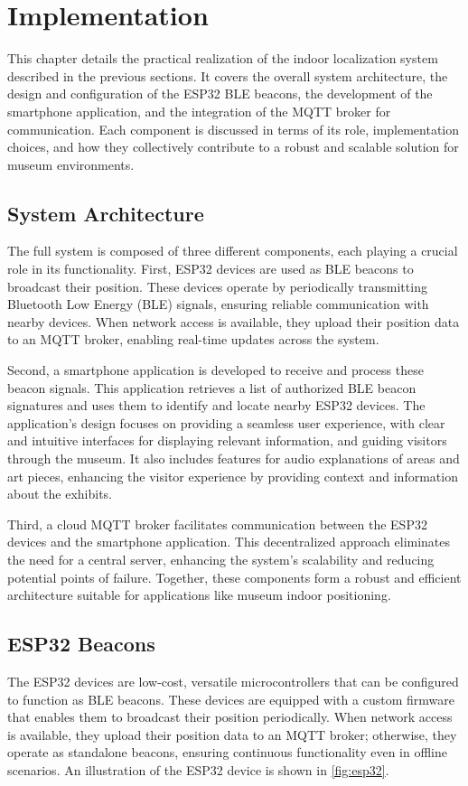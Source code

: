 \chapter{Implementation}
\label{chap:implementation}

This chapter details the practical realization of the indoor localization system described in the previous sections. It covers the overall system architecture, the design and configuration of the ESP32 BLE beacons, the development of the smartphone application, and the integration of the MQTT broker for communication. Each component is discussed in terms of its role, implementation choices, and how they collectively contribute to a robust and scalable solution for museum environments.

\section{System Architecture}
The full system is composed of three different components, each playing a crucial role in its functionality. First, ESP32 devices are used as BLE beacons to broadcast their position. These devices operate by periodically transmitting Bluetooth Low Energy (BLE) signals, ensuring reliable communication with nearby devices. When network access is available, they upload their position data to an MQTT broker, enabling real-time updates across the system.

Second, a smartphone application is developed to receive and process these beacon signals. This application retrieves a list of authorized BLE beacon signatures and uses them to identify and locate nearby ESP32 devices. The application’s design focuses on providing a seamless user experience, with clear and intuitive interfaces for displaying relevant information, and guiding visitors through the museum. It also includes features for audio explanations of areas and art pieces, enhancing the visitor experience by providing context and information about the exhibits.

Third, a cloud MQTT broker facilitates communication between the ESP32 devices and the smartphone application. This decentralized approach eliminates the need for a central server, enhancing the system’s scalability and reducing potential points of failure. Together, these components form a robust and efficient architecture suitable for applications like museum indoor positioning.

\section{ESP32 Beacons}
The ESP32 devices are low-cost, versatile microcontrollers that can be configured to function as BLE beacons. These devices are equipped with a custom firmware that enables them to broadcast their position periodically. When network access is available, they upload their position data to an MQTT broker; otherwise, they operate as standalone beacons, ensuring continuous functionality even in offline scenarios. An illustration of the ESP32 device is shown in \autoref{fig:esp32}.

